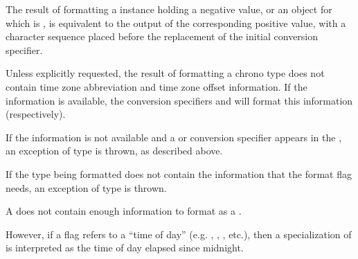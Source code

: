 \pnum
The result of formatting
a  instance holding a negative value, or
an  object  for which  is ,
is equivalent to the output of the corresponding positive value,
with a  character sequence
placed before the replacement of the initial conversion specifier.
\begin{example}
\end{example}

\pnum
Unless explicitly requested,
the result of formatting a chrono type
does not contain time zone abbreviation
and time zone offset information.
If the information is available,
the conversion specifiers  and 
will format this information (respectively).
\begin{note}
If the information is not available and
a  or 
conversion specifier appears in
the ,
an exception of type  is thrown,
as described above.
\end{note}

\pnum
If the type being formatted does not contain
the information that the format flag needs,
an exception of type  is thrown.
\begin{example}
A  does not contain enough information
to format as a .
\end{example}
However, if a flag refers to a ``time of day''
(e.g. , , , etc.),
then a specialization of  is interpreted as
the time of day elapsed since midnight.

